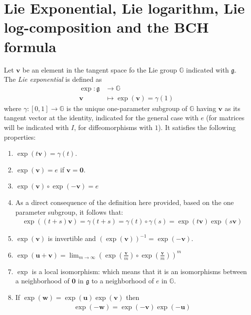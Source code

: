 \section{Lie Exponential, Lie logarithm, Lie log-composition and the BCH formula}\label{se:lie_exp_log_comp_bch}
Let $\mathbf{v}$ be an element in the tangent space fo the Lie group $\mathbb{G}$ indicated with $\mathfrak{g}$.
The \emph{Lie exponential} is defined as 
\begin{align*}
\exp :  \mathfrak{g} & \longrightarrow  \mathbb{G}  \\
\mathbf{v} &\longmapsto  \exp(\mathbf{v} ) = \gamma(1) %
\end{align*}
where $\gamma: [0,1]\rightarrow \mathbb{G} $ is the unique one-parameter subgroup of $\mathbb{G}$ having $\mathbf{v}$ as its tangent vector at the identity, indicated for the general case with $e$ (for matrices will be indicated with $I$, for diffeomorphisms with $1$).
It satisfies the following properties:
\begin{enumerate}
	\item $\exp(t\mathbf{v}) =\gamma(t) $.
	\item $\exp(\mathbf{v}) = e$ if $\mathbf{v} = \mathbf{0}$.
	\item $\exp(\mathbf{v})\circ \exp(\mathbf{-v})  = e$
	\item As a direct consequence of the definition here provided, based on the one parameter subgroup, it follows that:
	\begin{align*}
	\exp((t+s)\mathbf{v}) = \gamma(t+s) = \gamma(t)\circ \gamma(s) = \exp(t\mathbf{v})\exp(s\mathbf{v})
	\end{align*}
	\item $\exp(\mathbf{v})$ is invertible and $(\exp(\mathbf{v}))^{-1} = \exp(-\mathbf{v})$.
		\item  $\exp(\mathbf{u} + \mathbf{v}) =\lim_{m\rightarrow \infty} (\exp(\frac{\mathbf{v}}{m}) \circ\exp(\frac{\mathbf{v}}{m}))^{m}$
	\item $\exp$ is a local isomorphism: which means that it is an isomorphisms between a neighborhood of $\mathbf{0}$ in $\mathfrak{g}$ to a neighborhood of $e$ in $\mathbb{G}$.
	\item If $\exp(\mathbf{w}) = \exp(\mathbf{u})  \exp(\mathbf{v})$ then 
	\begin{align}\label{prop:lie_inversion_property}
	\exp(\mathbf{-w}) = \exp(\mathbf{-v}) \exp(\mathbf{-u})
	\end{align}
\end{enumerate}
